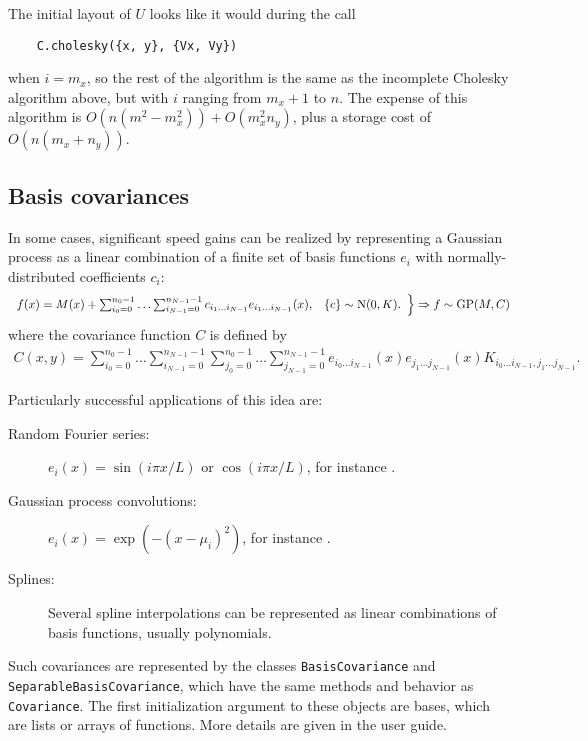 \documentclass{report}
\begin{document}
The initial layout of $U$ looks like it would during the call
\begin{verbatim}
    C.cholesky({x, y}, {Vx, Vy})
\end{verbatim}
when $i=m_x$, so the rest of the algorithm is the same as the incomplete Cholesky algorithm above, but with $i$ ranging from $m_x+1$ to $n$. The expense of this algorithm is $O(n(m^2-m_x^2))+O(m_x^2 n_y)$, plus a storage cost of $O(n(m_x+n_y))$.

\subsection{Basis covariances}\label{sec:basis}

In some cases, significant speed gains can be realized by representing a Gaussian process as a linear combination of a finite set of basis functions $e_i$ with normally-distributed coefficients $c_i$:
\begin{eqnarray*}
    \left.
    \begin{array}{ll}
        f(x) = M(x) + \sum_{i_0=0}^{n_0-1}\ldots \sum_{i_{N-1}=0}^{n_{N-1}-1} c_{i_1\ldots i_{N-1}} e_{i_1\ldots i_{N-1}}(x), &
        \{c\}\sim \textup{N}(0,K). 
    \end{array}
    \right\}
    \Rightarrow f \sim \textup{GP}(M,C) 
\end{eqnarray*}
where the covariance function $C$ is defined by
\begin{eqnarray*}
    C(x,y)=\sum_{i_0=0}^{n_0-1}\ldots \sum_{i_{N-1}=0}^{n_{N-1}-1} \sum_{j_0=0}^{n_0-1}\ldots \sum_{j_{N-1}=0}^{n_{N-1}-1} e_{i_0\ldots i_{N-1}}(x) e_{j_1\ldots j_{N-1}}(x) K_{i_0\ldots i_{N-1}, j_1\ldots j_{N-1}}.
\end{eqnarray*}

Particularly successful applications of this idea are:
\begin{description}
    \item[Random Fourier series:] $e_i(x) = \sin(i\pi x/L)$ or $\cos(i\pi x/L)$, for instance \cite{spanos}.
    \item[Gaussian process convolutions:] $e_i(x) = \exp(-(x-\mu_i)^2)$, for instance \cite{convolution}.
    \item[Splines:] Several spline interpolations can be represented as linear combinations of basis functions, usually polynomials. \cite{micula, lang_pspline} 
\end{description}

Such covariances are represented by the classes \texttt{BasisCovariance} and \texttt{SeparableBasisCovariance}, which have the same methods and behavior as \texttt{Covariance}. The first initialization argument to these objects are bases, which are lists or arrays of functions. More details are given in the user guide.
\end{document}
